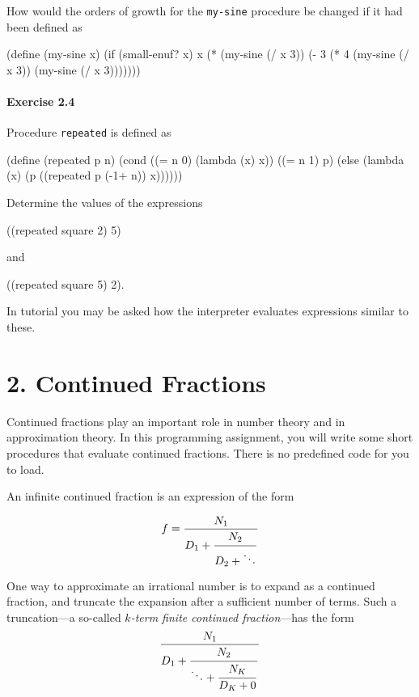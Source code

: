 How would the orders of growth for the {\tt my-sine} procedure
be changed if it had been defined as

\beginlisp
(define (my-sine x)
  (if (small-enuf? x)
      x
      (* (my-sine (/ x 3))
         (- 3
            (* 4 (my-sine (/ x 3))
                 (my-sine (/ x 3)))))))
\endlisp


\paragraph{ Exercise 2.4 }
Procedure {\tt repeated} is defined as

\beginlisp
(define (repeated p n)
  (cond ((= n 0) (lambda (x) x))
        ((= n 1) p)
        (else (lambda (x) (p ((repeated p (-1+ n)) x))))))
\endlisp

Determine the values of the expressions

\beginlisp
((repeated square 2) 5)
\endlisp

and

\beginlisp
((repeated square 5) 2).
\endlisp

In tutorial you may be asked how the interpreter evaluates expressions
similar to these.


\section{2. Continued Fractions}

Continued fractions play an important role in number theory and in
approximation theory.  In this programming
assignment, you will write some short procedures that evaluate
continued fractions.  There is no predefined code for you to load.

An infinite continued fraction is an expression of the form

\begin{displaymath}
f={{N_1} \over
  {\displaystyle D_1 + {{\strut N_2} \over
                {\displaystyle D_2 + \ddots }}}}
\end{displaymath}

One way to approximate an irrational number is to expand as a
continued fraction, and truncate the expansion after a sufficient
number of terms.  Such a truncation---a so-called {\em $k$-term finite
continued fraction}---has the form
\begin{displaymath}
{{N_1} \over {\displaystyle D_1+
        {\strut {N_2} \over {\displaystyle \ddots +
        {\strut {N_K} \over {\displaystyle D_K+0}}}}}}
\end{displaymath}


